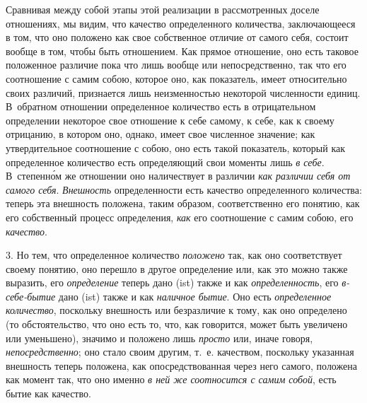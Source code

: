 Сравнивая между собой этапы этой реализации в рассмотренных доселе
отношениях, мы видим, что качество определенного количества, заключающееся
в том, что оно положено как свое собственное отличие от самого себя,
состоит вообще в том, чтобы быть отношением. Как прямое отношение, оно есть
таковое положенное различие пока что лишь вообще или непосредственно, так
что его соотношение с самим собою, которое оно, как показатель, имеет
относительно своих различий, признается лишь неизменностью некоторой
численности единиц. В~обратном отношении определенное количество есть в
отрицательном определении некоторое свое отношение к себе самому, к себе,
как к своему отрицанию, в котором оно, однако, имеет свое численное
значение; как утвердительное соотношение с собою, оно есть такой
показатель, который как определенное количество есть определяющий свои
моменты лишь {\em в себе}. В~степенн\'{о}м же отношении оно
наличествует в различии {\em как различии себя от
самого себя}. {\em Внешность} определенности есть
качество определенного количества: теперь эта внешность положена, таким
образом, соответственно его понятию, как его собственный процесс
определения, {\em как} его соотношение с самим собою,
его {\em качество}.

3. Но тем, что определенное количество {\em положено}
так, как оно соответствует своему понятию, оно перешло в другое определение
или, как это можно также выразить, его
{\em определение} теперь дано (ist) также и как
{\em определенность}, его
{\em в-себе-бытие} дано (ist) также и как
{\em наличное бытие}. Оно есть
{\em определенное количество}, поскольку внешность или
безразличие к тому, как оно определено (то обстоятельство, что оно есть то,
что, как говорится, может быть увеличено или уменьшено), значимо и положено
лишь {\em просто} или, иначе говоря,
{\em непосредственно}; оно стало своим другим, т.~е.
качеством, поскольку указанная внешность теперь положена, как
опосредствованная через него самого, положена как момент так, что оно
именно {\em в ней же соотносится с самим собой}, есть
бытие как качество.

